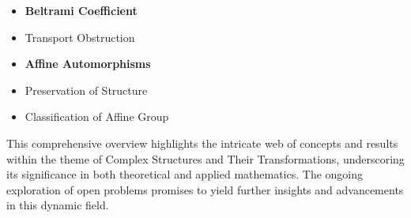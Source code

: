 \documentclass[11pt,a4paper]{article}
\begin{document}
\begin{itemize}
\item \textbf{Beltrami Coefficient}
\item Transport Obstruction
\end{itemize}

\begin{itemize}
\item \textbf{Affine Automorphisms}
\item Preservation of Structure
\item Classification of Affine Group
\end{itemize}

This comprehensive overview highlights the intricate web of concepts and results within the theme of Complex Structures and Their Transformations, underscoring its significance in both theoretical and applied mathematics. The ongoing exploration of open problems promises to yield further insights and advancements in this dynamic field.
\end{document}
